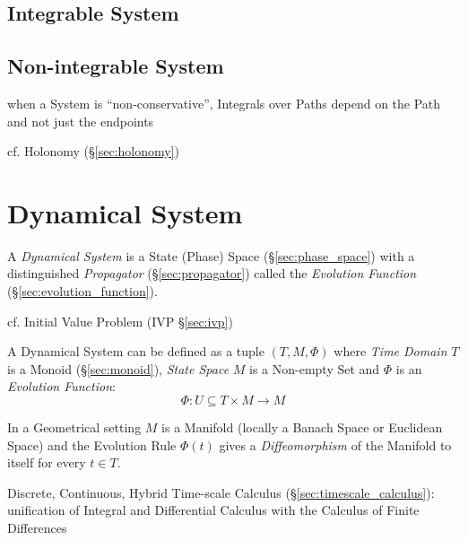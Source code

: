 


\subsection{Integrable System}\label{sec:integrable_system}

\subsection{Non-integrable System}\label{sec:nonintegrable_system}

when a System is ``non-conservative'', Integrals over Paths depend on the Path
and not just the endpoints

cf. Holonomy (\S\ref{sec:holonomy})



\section{Dynamical System}\label{sec:dynamical_system}

A \emph{Dynamical System} is a State (Phase) Space (\S\ref{sec:phase_space})
with a distinguished \emph{Propagator} (\S\ref{sec:propagator}) called the
\emph{Evolution Function} (\S\ref{sec:evolution_function}).

\fist cf. Initial Value Problem (IVP \S\ref{sec:ivp})

A Dynamical System can be defined as a tuple $(T,M,\Phi)$ where \emph{Time
  Domain} $T$ is a Monoid (\S\ref{sec:monoid}), \emph{State Space} $M$ is a
Non-empty Set and $\Phi$ is an \emph{Evolution Function}:
\[
  \Phi : U \subseteq T \times M \rightarrow M
\]

In a Geometrical setting $M$ is a Manifold (locally a Banach Space or Euclidean
Space) and the Evolution Rule $\Phi(t)$ gives a \emph{Diffeomorphism} of the
Manifold to itself for every $t \in T$. %

Discrete, Continuous, Hybrid \fist Time-scale Calculus
(\S\ref{sec:timescale_calculus}): unification of Integral and Differential
Calculus with the Calculus of Finite Differences

